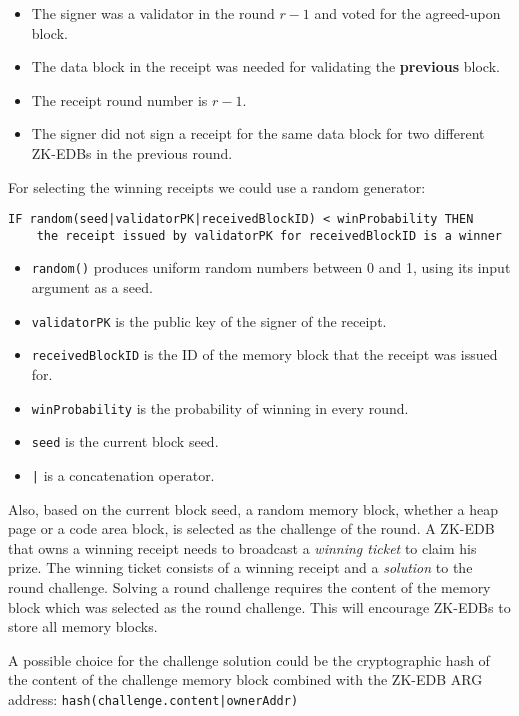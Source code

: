 \begin{itemize}
    \item The signer was a validator in the round $r - 1$ and voted for the agreed-upon block.
    \item The data block in the receipt was needed for validating the \textbf{previous} block.
    \item The receipt round number is $r - 1$.
    \item The signer did not sign a receipt for the same data block for two different ZK-EDBs in the previous round.
\end{itemize}
For selecting the winning receipts we could use a random generator:
\begin{verbatim}
IF random(seed|validatorPK|receivedBlockID) < winProbability THEN
    the receipt issued by validatorPK for receivedBlockID is a winner
\end{verbatim}
\begin{itemize}
    \item \texttt{random()} produces uniform random numbers between 0 and 1, using its input argument as a seed.
    \item \texttt{validatorPK} is the public key of the signer of the receipt.
    \item \texttt{receivedBlockID} is the ID of the memory block that the receipt was issued for.
    \item \texttt{winProbability} is the probability of winning in every round.
    \item \texttt{seed} is the current block seed.
    \item \texttt{|} is a concatenation operator.
\end{itemize}


Also, based on the current block seed, a random memory block, whether a heap page or a code area block, is
selected as the challenge of the round. A ZK-EDB that owns a winning receipt needs to broadcast a \emph{winning
ticket} to claim his prize. The winning ticket consists of a winning receipt and a \emph{solution} to the round
challenge. Solving a round challenge requires the content of the memory block which was selected as the round
challenge. This will encourage ZK-EDBs to store all memory blocks.

A possible choice for the challenge solution could be the cryptographic hash of the content of the challenge
memory block combined with the ZK-EDB ARG address: \texttt{hash(challenge.content|ownerAddr)}

